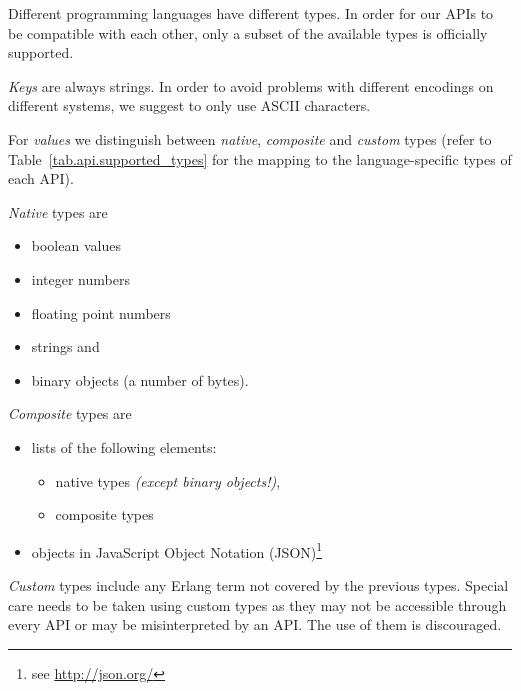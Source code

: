 Different programming languages have different types. In order for our APIs
to be compatible with each other, only a subset of the available types is
officially supported.

\emph{Keys} are always strings. In order to avoid problems with different
encodings on different systems, we suggest to only use ASCII characters.

For \emph{values} we distinguish between \emph{native}, \emph{composite}
and \emph{custom} types (refer to Table~\ref{tab.api.supported_types} for the
mapping to the language-specific types of each API).

\emph{Native} types are
\begin{itemize}
  \item boolean values
  \item integer numbers
  \item floating point numbers
  \item strings and
  \item binary objects (a number of bytes).
\end{itemize}

\emph{Composite} types are
\begin{itemize}
  \item lists of the following elements:
  \begin{itemize}
    \item native types \emph{(except binary objects!)},
    \item composite types
  \end{itemize}
  \item objects in JavaScript Object Notation (JSON)\footnote{see \url{http://json.org/}}
\end{itemize}

\emph{Custom} types include any Erlang term not covered by the previous types.
Special care needs to be taken using custom types as they may not be accessible
through every API or may be misinterpreted by an API. The use of them is
discouraged.

